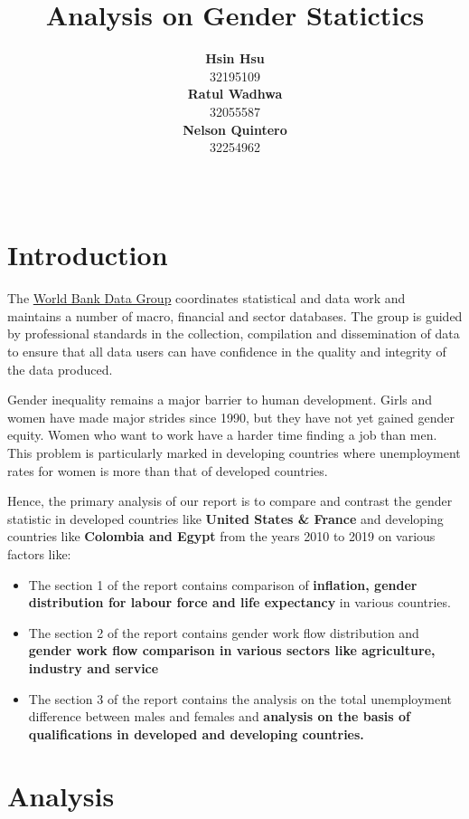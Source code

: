\documentclass[11pt,a4paper,]{article}
\title{Analysis on Gender Statictics}
\author{\sf\Large\textbf{ Hsin Hsu}\\ {\sf\large 32195109\\[0.5cm]} \sf\Large\textbf{ Ratul Wadhwa}\\ {\sf\large 32055587\\[0.5cm]} \sf\Large\textbf{ Nelson Quintero}\\ {\sf\large 32254962\\[0.5cm]}}
\date{\sf\Date~\Month~\Year}
\makeatletter
\def\titlepage{\front{\expandafter{\@title}}{\@author}{\@organization}}
\makeatother
\begin{document}
\titlepage

{
\setcounter{tocdepth}{2}
\tableofcontents
}
\clearpage

\hypertarget{introduction}{%
\section{Introduction}\label{introduction}}

The \href{https://data.worldbank.org/}{World Bank Data Group} coordinates statistical and data work and maintains a number of macro, financial and sector databases. The group is guided by professional standards in the collection, compilation and dissemination of data to ensure that all data users can have confidence in the quality and integrity of the data produced.

Gender inequality remains a major barrier to human development. Girls and women have made major strides since 1990, but they have not yet gained gender equity. Women who want to work have a harder time finding a job than men. This problem is particularly marked in developing countries where unemployment rates for women is more than that of developed countries.

Hence, the primary analysis of our report is to compare and contrast the gender statistic in developed countries like \textbf{United States \& France} and developing countries like \textbf{Colombia and Egypt} from the years 2010 to 2019 on various factors like:

\begin{itemize}
\item
  The section 1 of the report contains comparison of \textbf{inflation, gender distribution for labour force and life expectancy} in various countries.
\item
  The section 2 of the report contains gender work flow distribution and \textbf{gender work flow comparison in various sectors like agriculture, industry and service}
\item
  The section 3 of the report contains the analysis on the total unemployment difference between males and females and \textbf{analysis on the basis of qualifications in developed and developing countries.}
\end{itemize}

\clearpage

\hypertarget{analysis}{%
\section{Analysis}\label{analysis}}
\end{document}
